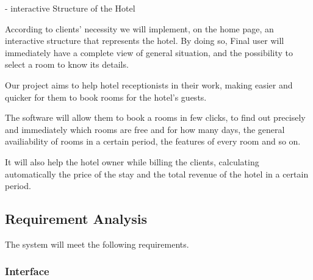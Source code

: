  
	- interactive Structure of the Hotel 
	
	According to clients’ necessity we will implement, on the home page, an interactive structure that represents the hotel. By doing so, Final user will immediately have a complete view of general situation, and the possibility to select a room to know its details.

Our project aims to help hotel receptionists in their work, making easier and quicker for them to book rooms for the hotel's guests. 

The software will allow them to book a rooms in few clicks, to find out precisely and immediately which rooms are free and for how many days, the general availiability of rooms in a certain period, the features of every room and so on. 

It will also help the hotel owner while billing the clients, calculating automatically the price of the stay and the total revenue of the hotel in a certain period.


\subsection{Requirement Analysis}

The system will meet the following requirements.

\subsubsection{Interface}

